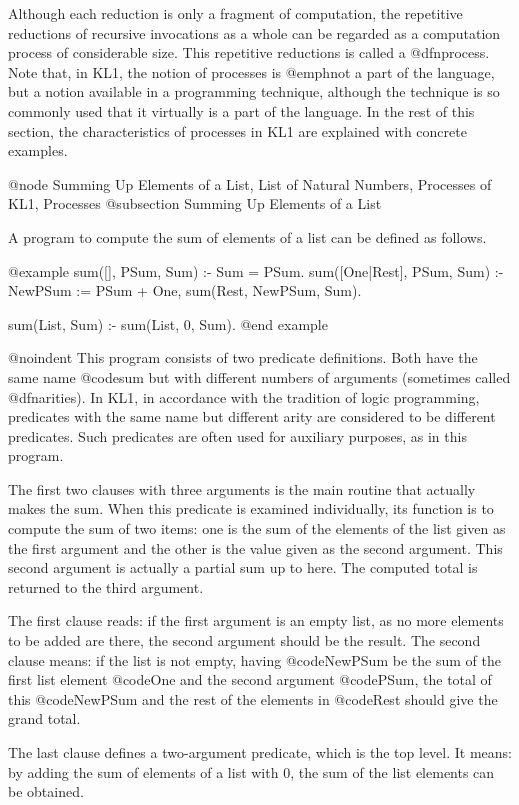 {Although each reduction is only a fragment of computation, the
repetitive reductions of recursive invocations as a whole can be
regarded as a computation process of considerable size.  This repetitive
reductions is called a @dfn{process}.  Note that, in KL1, the notion of
processes is @emph{not} a part of the language, but a notion available
in a programming technique, although the technique is so commonly used
that it virtually is a part of the language.  In the rest of this
section, the characteristics of processes in KL1 are explained with
concrete examples.

@node Summing Up Elements of a List, List of Natural Numbers, Processes of KL1, Processes
@subsection Summing Up Elements of a List

A program to compute the sum of elements of a list can be defined as
follows.

@example
sum([], PSum, Sum) :- Sum = PSum.
sum([One|Rest], PSum, Sum) :-
    NewPSum := PSum + One,
    sum(Rest, NewPSum, Sum).

sum(List, Sum) :- sum(List, 0, Sum).
@end example

@noindent
This program consists of two predicate definitions.  Both have the same
name @code{sum} but with different numbers of arguments (sometimes called
@dfn{arities}).  In KL1, in accordance with the tradition of logic
programming, predicates with the same name but different arity are
considered to be different predicates.  Such predicates are often used
for auxiliary purposes, as in this program.

The first two clauses with three arguments is the main routine that
actually makes the sum.  When this predicate is examined individually,
its function is to compute the sum of two items: one is the sum of the
elements of the list given as the first argument and the other is the
value given as the second argument.  This second argument is actually a
partial sum up to here.  The computed total is returned to the third
argument.

The first clause reads: if the first argument is an empty list, as no
more elements to be added are there, the second argument should be the
result.  The second clause means: if the list is not empty, having
@code{NewPSum} be the sum of the first list element @code{One} and the
second argument @code{PSum}, the total of this @code{NewPSum} and the
rest of the elements in @code{Rest} should give the grand total.

The last clause defines a two-argument predicate, which is the top
level.  It means: by adding the sum of elements of a list with 0, the
sum of the list elements can be obtained.

}
